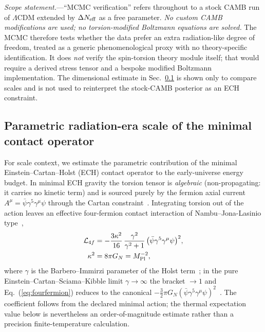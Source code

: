 \documentclass[aps,prd,twocolumn,superscriptaddress,showpacs,preprintnumbers,nofootinbib,longbibliography,floatfix]{revtex4-2}
\newcommand{\MPl}{M_{\rm Pl}}
\newcommand{\Neff}{N_{\rm eff}}
\begin{document}
\textit{Scope statement.}---``MCMC verification'' refers throughout to a stock
CAMB run of $\Lambda$CDM extended by $\Delta\Neff$ as a free parameter.
\emph{No custom CAMB modifications are used; no torsion-modified Boltzmann
equations are solved.} The MCMC therefore tests whether the data prefer an
extra radiation-like degree of freedom, treated as a generic phenomenological
proxy with no theory-specific identification.  It does \emph{not} verify the
spin-torsion theory module itself; that would require a derived stress tensor
and a bespoke modified Boltzmann implementation.  The dimensional estimate in
Sec.~\ref{sec:torsion_neff} is shown only to compare scales and is not used to
reinterpret the stock-CAMB posterior as an ECH constraint.

\subsection{Parametric radiation-era scale of the minimal contact operator}
\label{sec:torsion_neff}

For scale context, we estimate the parametric contribution of the minimal
Einstein--Cartan--Holst (ECH) contact operator to the early-universe energy
budget. In minimal ECH gravity the torsion tensor is
\emph{algebraic} (non-propagating: it carries no kinetic term) and is sourced
purely by the fermion axial current $A^\mu=\bar\psi\gamma^5\gamma^\mu\psi$
through the Cartan constraint~\cite{Hehl1976}. Integrating torsion out of the
action leaves an effective four-fermion contact interaction of
Nambu--Jona-Lasinio type~\cite{Poplawski2011,Freidel2005},
\begin{align}
\mathcal{L}_{4f}&=-\frac{3\kappa^2}{16}\,
\frac{\gamma^2}{\gamma^2+1}\,
\big(\bar\psi\gamma^5\gamma^\mu\psi\big)^2 ,\nonumber\\
\kappa^2&=8\pi G_N=\MPl^{-2} ,
\label{eq:fourfermion}
\end{align}
where $\gamma$ is the Barbero--Immirzi parameter of the Holst
term~\cite{Freidel2005,Mercuri2006}; in the pure Einstein--Cartan--Sciama--Kibble
limit $\gamma\to\infty$ the bracket $\to 1$ and
Eq.~(\ref{eq:fourfermion}) reduces to the canonical
$-\tfrac{3}{2}\pi G_N (\bar\psi\gamma^5\gamma^\mu\psi)^2$~\cite{Poplawski2011}.
The coefficient follows from the declared minimal action; the thermal
expectation value below is nevertheless an order-of-magnitude estimate rather
than a precision finite-temperature calculation.
\end{document}

